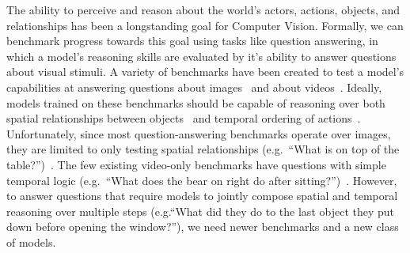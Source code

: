 \documentclass[10pt,twocolumn,letterpaper]{article}
\newcommand{\rak}[1]{{\color{red}{rak: #1}}}
\newcommand{\mgm}[1]{{\color{cyan}{mgm: #1}}}
\begin{document}
The ability to perceive and reason about the world's actors, actions, objects, and relationships has been a longstanding goal for Computer Vision. Formally, we can benchmark progress towards this goal using tasks like question answering, in which a model's reasoning skills are evaluated by it's ability to answer questions about visual stimuli. A variety of benchmarks have been created to test a model's capabilities at answering questions about images~\cite{johnson2017clevr,hudson2019gqa,antol2015vqa,zellers2019recognition,goyal2017making,krishna2017visual,zhu2016visual7w,kim2020answering} and about videos~\cite{tapaswi2016movieqa,lei2018tvqa,jang2017tgif,kim2017deepstory,xu2017video,maharaj2017dataset,zeng2016leveraging,yu2019activitynet}. Ideally, models trained on these benchmarks should be capable of reasoning over both spatial relationships between objects~\cite{krishna2017visual,lu2016visual} and temporal ordering of actions~\cite{zacks2001events,ji2020action}. Unfortunately, since most question-answering benchmarks operate over images, they are limited to only testing spatial relationships (e.g.~``What is on top of the table?'')~\cite{hudson2019gqa,krishna2017visual,antol2015vqa}. The few existing video-only benchmarks have questions with simple temporal logic (e.g.~``What does the bear on right do after sitting?'')~\cite{jang2017tgif,xu2017video,maharaj2017dataset,zeng2016leveraging,yu2019activitynet}. \mgm{Think I need more detail here, or when i bring it in later. Add in cleverer and commonsense reasoning} However, to answer questions that require models to jointly compose spatial and temporal reasoning over multiple steps (e.g.``What did they do to the last object they put down before opening the window?''), we need newer benchmarks and a new class of models.

\end{document}
